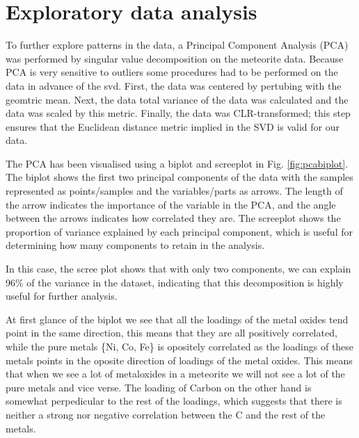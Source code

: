 \section{Exploratory data analysis}

To further explore patterns in the data, a Principal Component Analysis (PCA) was performed by singular value decomposition on the meteorite data.
Because PCA is very sensitive to outliers some procedures had to be performed on the data in advance of the svd. First,
the data was centered by pertubing with the geomtric mean. Next, 
the data total variance of the data was calculated and the data was scaled by this metric. Finally, 
the data was CLR-transformed; this step ensures that the Euclidean distance metric implied in the SVD is valid for our data.  

The PCA has been visualised using a biplot and screeplot in Fig. \ref{fig:pcabiplot}. The biplot shows the first two principal components of the data with the samples
represented as points/samples and the variables/parts as arrows. The length of the arrow indicates the importance of the variable in the PCA, and the angle between the arrows indicates how correlated they are.
The screeplot shows the proportion of variance explained by each principal component, which is useful for determining how many components to retain in the analysis. 

In this case, the scree plot shows that with only two components, we can explain 96\% of the variance in the dataset, indicating that this decomposition is highly useful for further analysis.

At first glance of the biplot we see that all the loadings of the metal oxides tend point in the same direction, this means that they are all positively correlated, while the pure metals \{Ni, Co, Fe\} is opositely correlated as the loadings of these metals points in the oposite direction of loadings of the metal oxides. This means that when we see a lot of metaloxides in a meteorite we will not see a lot of the pure metals and vice verse. The loading of Carbon on the other hand is somewhat 
perpedicular to the rest of the loadings, which suggests that there is neither a strong nor negative correlation between the 
C and the rest of the metals. 


